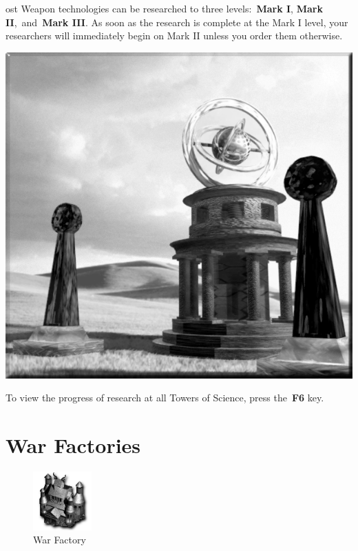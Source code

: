 
ost Weapon technologies can be researched to three levels: \textbf{Mark I}, \textbf{Mark II}, and \textbf{Mark III}. As soon as the research is complete at the Mark I level, your researchers will immediately begin on Mark II unless you order them otherwise.

\begin{center}
	\includegraphics[width=0.9\linewidth]{Atower}
\end{center}

To view the progress of research at all Towers of Science, press the \textbf{F6} key.

\section{War Factories}


\begin{figure}
	\vspace{-20pt}
	\begin{center}
		\includegraphics[width=0.2\textwidth]{Iwarfactory}
		\\ War Factory
	\end{center}
	\vspace{-20pt}
\end{figure}

